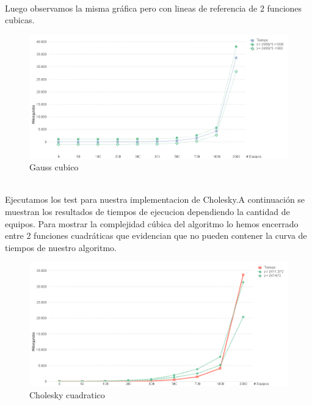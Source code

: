 \\

Luego observamos la misma gráfica pero con lineas de referencia de 2 funciones cubicas. \\

\begin{figure}[H]
\centering
\includegraphics[width=1\textwidth]{IMG/gauss cubico.png}
\caption{Gauss cubico}
\label{fig:Gauss cubico}
\end{figure}

\\
Ejecutamos los test para nuestra implementacion de Cholesky.A continuación se muestran los resultados de tiempos de ejecucion dependiendo la cantidad de equipos.
Para mostrar la complejidad cúbica del algoritmo lo hemos encerrado entre 2 funciones cuadráticas que evidencian que no pueden contener la curva de tiempos de nuestro algoritmo.\\


\begin{figure}[H]
\centering
\includegraphics[width=1\textwidth]{IMG/cholesky cuadratico.png}
\caption{Cholesky cuadratico}
\label{fig:Cholesky cuadratico}
\end{figure}

\\


